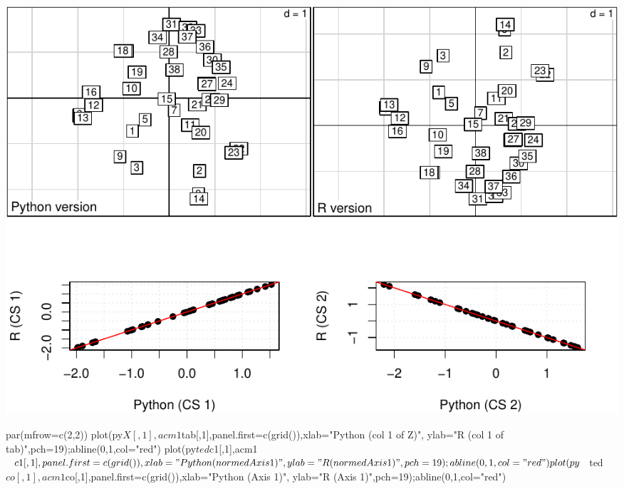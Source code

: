 \documentclass[
  10pt,
]{article}
\newenvironment{Shaded}{\begin{snugshade}}{\end{snugshade}}
\newcommand{\NormalTok}[1]{#1}
\begin{document}
\begin{Shaded}
\end{Shaded}

\includegraphics{RandPytonAnalysisPDF_files/figure-latex/unnamed-chunk-37-1.pdf}

\begin{Shaded}
\begin{Highlighting}[]
\NormalTok{par(mfrow=c(2,2))}
\NormalTok{plot(py$X[,1],acm1$tab[,1],panel.first=c(grid()),xlab="Python (col 1 of Z)",}
\NormalTok{     ylab="R (col 1 of tab)",pch=19);abline(0,1,col="red")}
\NormalTok{plot(py$ted$c1[,1],acm1$c1[,1],panel.first=c(grid()),xlab="Python (normed Axis 1)",}
\NormalTok{     ylab="R (normed Axis 1)",pch=19);abline(0,1,col="red")}
\NormalTok{plot(py$ted$co[,1],acm1$co[,1],panel.first=c(grid()),xlab="Python (Axis 1)",}
\NormalTok{     ylab="R (Axis 1)",pch=19);abline(0,1,col="red")}
\end{Highlighting}
\end{Shaded}
\end{document}
